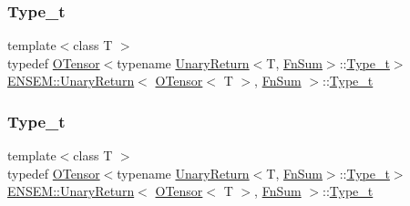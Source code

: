 \subsubsection{\texorpdfstring{Type\_t}{Type\_t}\hspace{0.1cm}{\footnotesize\ttfamily [1/3]}}
{\footnotesize\ttfamily template$<$class T $>$ \\
typedef \mbox{\hyperlink{classENSEM_1_1OTensor}{O\+Tensor}}$<$typename \mbox{\hyperlink{structENSEM_1_1UnaryReturn}{Unary\+Return}}$<$T, \mbox{\hyperlink{structENSEM_1_1FnSum}{Fn\+Sum}}$>$\+::\mbox{\hyperlink{structENSEM_1_1UnaryReturn_3_01OTensor_3_01T_01_4_00_01FnSum_01_4_a97a77020ae2f9a17419c0a6b9c45b5b9}{Type\+\_\+t}}$>$ \mbox{\hyperlink{structENSEM_1_1UnaryReturn}{E\+N\+S\+E\+M\+::\+Unary\+Return}}$<$ \mbox{\hyperlink{classENSEM_1_1OTensor}{O\+Tensor}}$<$ T $>$, \mbox{\hyperlink{structENSEM_1_1FnSum}{Fn\+Sum}} $>$\+::\mbox{\hyperlink{structENSEM_1_1UnaryReturn_3_01OTensor_3_01T_01_4_00_01FnSum_01_4_a97a77020ae2f9a17419c0a6b9c45b5b9}{Type\+\_\+t}}}

\mbox{\label{structENSEM_1_1UnaryReturn_3_01OTensor_3_01T_01_4_00_01FnSum_01_4_a97a77020ae2f9a17419c0a6b9c45b5b9}} 
\subsubsection{\texorpdfstring{Type\_t}{Type\_t}\hspace{0.1cm}{\footnotesize\ttfamily [2/3]}}
{\footnotesize\ttfamily template$<$class T $>$ \\
typedef \mbox{\hyperlink{classENSEM_1_1OTensor}{O\+Tensor}}$<$typename \mbox{\hyperlink{structENSEM_1_1UnaryReturn}{Unary\+Return}}$<$T, \mbox{\hyperlink{structENSEM_1_1FnSum}{Fn\+Sum}}$>$\+::\mbox{\hyperlink{structENSEM_1_1UnaryReturn_3_01OTensor_3_01T_01_4_00_01FnSum_01_4_a97a77020ae2f9a17419c0a6b9c45b5b9}{Type\+\_\+t}}$>$ \mbox{\hyperlink{structENSEM_1_1UnaryReturn}{E\+N\+S\+E\+M\+::\+Unary\+Return}}$<$ \mbox{\hyperlink{classENSEM_1_1OTensor}{O\+Tensor}}$<$ T $>$, \mbox{\hyperlink{structENSEM_1_1FnSum}{Fn\+Sum}} $>$\+::\mbox{\hyperlink{structENSEM_1_1UnaryReturn_3_01OTensor_3_01T_01_4_00_01FnSum_01_4_a97a77020ae2f9a17419c0a6b9c45b5b9}{Type\+\_\+t}}}

